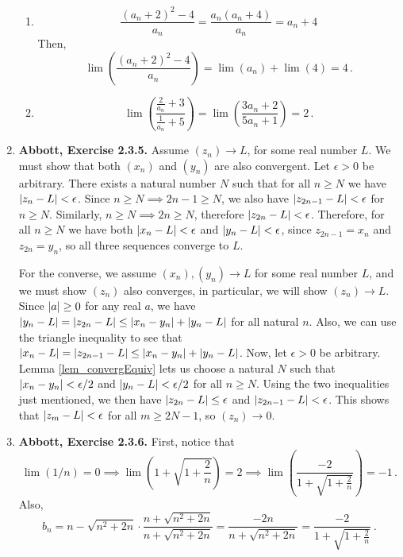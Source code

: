 \documentclass{article}
\DeclarePairedDelimiter\abs{\lvert}{\rvert}
\newcommand{\exc}[2][Abbott]{\item \textbf{#1, Exercise #2.}}
\begin{document}
\begin{enumerate}
\begin{enumerate}
		\item \begin{equation*}
		      \frac{(a_n+2)^2-4}{a_n} = \frac{a_n (a_n+4)}{a_n} = a_n + 4
		\end{equation*}
		Then, \begin{equation*}
		\lim (\frac{(a_n+2)^2-4}{a_n}) = \lim (a_n) + \lim(4) = 4 \, .
		\end{equation*}
							      		        
		\item \begin{equation*}
		      \lim(\frac{\frac{2}{a_n}+3}{\frac{1}{a_n}+5}) = \lim (\frac{3a_n + 2}{5a_n + 1}) = 2 \, .
		\end{equation*}
	\end{enumerate}
				      
	\exc{2.3.5}
	Assume $(z_n) \rightarrow L$, for some real number $L$. We must show that both $(x_n)$ and $(y_n)$ are also convergent. Let $\epsilon > 0$ be arbitrary. There exists a natural number $N$ such that for all $n \geq N$ we have $\abs*{z_n - L} < \epsilon$. Since $n \geq N \implies 2n-1 \geq N$, we also have $\abs*{z_{2n-1} - L} < \epsilon$ for $n \geq N$. Similarly, $n \geq N \implies 2n \geq N$, therefore $\abs*{z_{2n}-L} < \epsilon$. Therefore, for all $n \geq N$ we have both $\abs*{x_n - L} < \epsilon$ and $\abs*{y_n - L} < \epsilon$, since $z_{2n-1} = x_n$ and $z_{2n} = y_n$, so all three sequences converge to $L$.
			        
	For the converse, we assume $(x_n), (y_n) \rightarrow L$ for some real number $L$, and we must show $(z_n)$ also converges, in particular, we will show $(z_n) \rightarrow L$. Since $\abs*{a} \geq 0$ for any real $a$, we have $\abs*{y_n-L} = \abs*{z_{2n} - L} \leq \abs*{x_n-y_n} + \abs*{y_n-L}$ for all natural $n$. Also, we can use the triangle inequality to see that $\abs*{x_n-L} = \abs*{z_{2n-1}- L} \leq \abs*{x_n-y_n} + \abs*{y_n - L}$. Now, let $\epsilon > 0$ be arbitrary. Lemma \ref{lem_convergEquiv} lets us choose a natural $N$ such that $\abs*{x_n-y_n} < \epsilon/2$ and $\abs*{y_n-L} < \epsilon/2$ for all $n \geq N$. Using the two inequalities just mentioned, we then have $\abs*{z_{2n} - L} \leq \epsilon$ and $\abs*{z_{2n-1} - L} < \epsilon$. This shows that $\abs*{z_m - L} < \epsilon$ for all $m \geq 2N-1$, so $(z_n) \rightarrow 0$.
			        
			        
	\exc{2.3.6}
	First, notice that
	\begin{equation*}
		\lim (1/n) = 0 \implies \lim(1+\sqrt{1+\frac{2}{n}}) = 2 \implies \lim (\frac{-2}{1+\sqrt{1+ \frac{2}{n}}}) = -1 \, .
	\end{equation*}
	Also, 
	\begin{equation*}
		b_n = n-\sqrt{n^2+2n} \cdot \frac{n+\sqrt{n^2+2n}}{n+\sqrt{n^2+2n}} = \frac{-2n}{n+\sqrt{n^2+2n}} = \frac{-2}{1+\sqrt{1+\frac{2}{n}}} ~ .
	\end{equation*}
			        

\end{enumerate}
\end{document}
